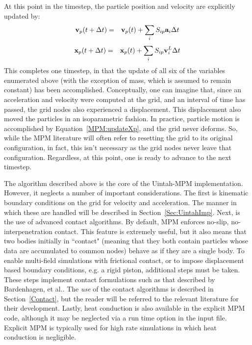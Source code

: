 At this point in the timestep, the particle position and velocity are explicitly
updated by:
\begin{eqnarray}
\bfv_p (t + \Delta{t})  &=& \bfv_p (t)  + \sum_{i} S_{ip} \bfa_i  \Delta{t} 
\label{MPM:updateVp}
\end{eqnarray}
\begin{eqnarray}
\bfx_p (t + \Delta{t})  &=& \bfx_p (t)  + \sum_{i} S_{ip} \bfv^L_i  \Delta{t}
\label{MPM:updateXp}
\end{eqnarray}
This completes one timestep, in that the update of all six of the variables
enumerated above (with the exception of mass, which is assumed to remain
constant) has been accomplished.  Conceptually, one can imagine that, since an
acceleration and velocity were computed at the grid, and an interval of time
has passed, the grid nodes also experienced a displacement.  This 
displacement also moved the particles in an isoparametric fashion.  In
practice, particle motion is accomplished by Equation~\ref{MPM:updateXp},
and the grid never deforms.  So, while the MPM literature will often refer
to resetting the grid to its original configuration, in fact, this 
isn't necessary as the grid nodes never leave that configuration.  Regardless,
at this point, one is ready to advance to the next timestep.

The algorithm described above is the core of the Uintah-MPM implementation.
However, it neglects a number of important considerations.  The first is
kinematic boundary conditions on the grid for velocity and acceleration.
The manner in which these are handled will be described in
Section~\ref{Sec:UintahImp}.  Next, is the use of advanced contact
algorithms.  By default, MPM enforces no-slip, no-interpenetration contact.
This feature is extremely useful, but it also means that two bodies initially
in ``contact" (meaning that they both contain particles whose data are
accumulated to common nodes) behave as if they are a single body.  To enable
multi-field simulations with frictional contact, or to impose displacement
based boundary conditions, e.g. a rigid piston, additional steps must be
taken.  These steps implement contact formulations such as that described
by Bardenhagen, et al.\cite{bard_contact}.  The {\it use} of the contact
algorithms is described in Section~\ref{Contact}, but the reader will be
referred to the relevant literature for their development.  Lastly, heat
conduction is also available in the explicit MPM code, although it may be
neglected via a run time option in the input file.  Explicit MPM is typically
used for high rate simulations in which heat conduction is negligible.


